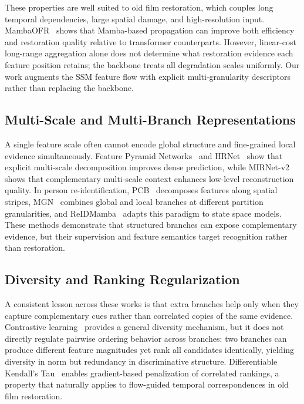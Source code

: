 \documentclass[symmetry,article,submit,pdftex,moreauthors]{Definitions/mdpi}
\begin{document}
These properties are well suited to old film restoration, which couples long temporal dependencies, large spatial damage, and high-resolution input. MambaOFR~\cite{mao2025mambaofr} shows that Mamba-based propagation can improve both efficiency and restoration quality relative to transformer counterparts. However, linear-cost long-range aggregation alone does not determine what restoration evidence each feature position retains; the backbone treats all degradation scales uniformly. Our work augments the SSM feature flow with explicit multi-granularity descriptors rather than replacing the backbone.

\subsection{Multi-Scale and Multi-Branch Representations}
\label{subsec:multigran}

A single feature scale often cannot encode global structure and fine-grained local evidence simultaneously. Feature Pyramid Networks~\cite{lin2017fpn} and HRNet~\cite{wang2021hrnet} show that explicit multi-scale decomposition improves dense prediction, while MIRNet-v2~\cite{zamir2022mirnetv2} shows that complementary multi-scale context enhances low-level reconstruction quality. In person re-identification, PCB~\cite{sun2018pcb} decomposes features along spatial stripes, MGN~\cite{wang2018mgn} combines global and local branches at different partition granularities, and ReIDMamba~\cite{gu2025reidmamba} adapts this paradigm to state space models. These methods demonstrate that structured branches can expose complementary evidence, but their supervision and feature semantics target recognition rather than restoration.

\subsection{Diversity and Ranking Regularization}
\label{subsec:diversity_ranking}

A consistent lesson across these works is that extra branches help only when they capture complementary cues rather than correlated copies of the same evidence. Contrastive learning~\cite{chen2020mocov2} provides a general diversity mechanism, but it does not directly regulate pairwise ordering behavior across branches: two branches can produce different feature magnitudes yet rank all candidates identically, yielding diversity in norm but redundancy in discriminative structure. Differentiable Kendall's Tau~\cite{zheng2023diffkendall} enables gradient-based penalization of correlated rankings, a property that naturally applies to flow-guided temporal correspondences in old film restoration.
\end{document}
